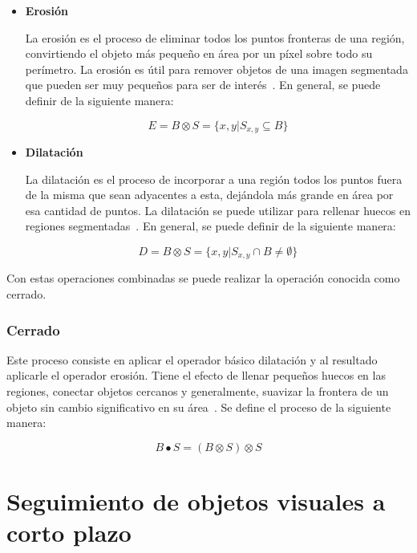 \begin{itemize}
	\item \textbf{Erosión}
	
	La erosión es el proceso de eliminar todos los puntos fronteras de una región, convirtiendo el objeto más pequeño en área por un píxel sobre todo su perímetro. La erosión es útil para remover objetos de una imagen segmentada que pueden ser muy pequeños para ser de interés~\cite{castleman1996digital}. En general, se puede definir de la siguiente manera:
	
	\begin{equation}
		E = B \otimes S = \{x, y | S_{x, y} \subseteq B\}
	\end{equation}

	\item \textbf{Dilatación}
	
	La dilatación es el proceso de incorporar a una región todos los puntos fuera de la misma que sean adyacentes a esta, dejándola más grande en área por esa cantidad de puntos. La dilatación se puede utilizar para rellenar huecos en regiones segmentadas~\cite{castleman1996digital}. En general, se puede definir de la siguiente manera:
	
	\begin{equation}
		D = B \otimes S = \{x, y | S_{x, y} \cap B \neq \emptyset\}
	\end{equation}
\end{itemize}

Con estas operaciones combinadas se puede realizar la operación conocida como cerrado.

\subsubsection{Cerrado}

 Este proceso consiste en aplicar el operador básico dilatación y al resultado aplicarle el operador erosión. Tiene el efecto de llenar pequeños huecos en las regiones, conectar objetos cercanos y generalmente, suavizar la frontera de un objeto sin cambio significativo en su área~\cite{castleman1996digital}. Se define el proceso de la siguiente manera:

\begin{equation}
	B \bullet S = (B \otimes S) \otimes S
\end{equation}

\section{Seguimiento de objetos visuales a corto plazo}\label{section:tracking}

